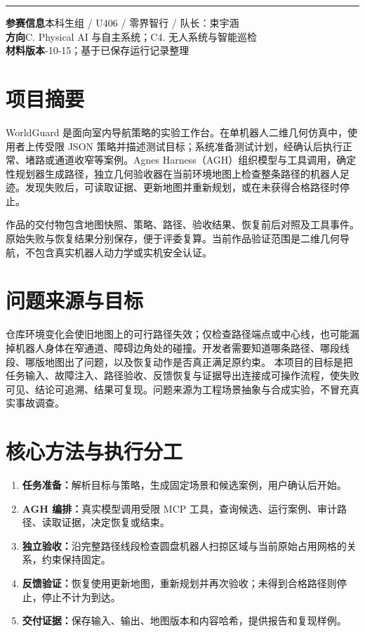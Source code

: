 \documentclass[UTF8,10pt,a4paper]{ctexart}
\newcommand{\cover}[2]{\vspace*{5mm}{\small\textcolor{teal}{WORLDGUARD / SUBMISSION 2026}}\par\vspace{4mm}{\huge\bfseries\color{ink}#1}\par\vspace{3mm}{\large #2}\par\vspace{4mm}\hrule\vspace{5mm}}
\begin{document}
\cover{WorldGuard 项目报告}{面向具身导航的故障测试、独立验收与恢复验证}
\textbf{参赛信息}\quad 本科生组 / U406 / 零界智行 / 队长：束宇涵\\
\textbf{方向}\quad C. Physical AI 与自主系统；C4. 无人系统与智能巡检\\
\textbf{材料版本}-10-15；基于已保存运行记录整理
\section{项目摘要}
WorldGuard 是面向室内导航策略的实验工作台。在单机器人二维几何仿真中，使用者上传受限 JSON 策略并描述测试目标；系统准备测试计划，经确认后执行正常、堵路或通道收窄等案例。Agnes Harness（AGH）组织模型与工具调用，确定性规划器生成路径，独立几何验收器在当前环境地图上检查整条路径的机器人足迹。发现失败后，可读取证据、更新地图并重新规划，或在未获得合格路径时停止。

作品的交付物包含地图快照、策略、路径、验收结果、恢复前后对照及工具事件。原始失败与恢复结果分别保存，便于评委复算。当前作品验证范围是二维几何导航，不包含真实机器人动力学或实机安全认证。
\section{问题来源与目标}
仓库环境变化会使旧地图上的可行路径失效；仅检查路径端点或中心线，也可能漏掉机器人身体在窄通道、障碍边角处的碰撞。开发者需要知道哪条路径、哪段线段、哪版地图出了问题，以及恢复动作是否真正满足原约束。
本项目的目标是把任务输入、故障注入、路径验收、反馈恢复与证据导出连接成可操作流程，使失败可见、结论可追溯、结果可复现。问题来源为工程场景抽象与合成实验，不冒充真实事故调查。
\section{核心方法与执行分工}
\begin{enumerate}
\item \textbf{任务准备：}解析目标与策略，生成固定场景和候选案例，用户确认后开始。
\item \textbf{AGH 编排：}真实模型调用受限 MCP 工具，查询候选、运行案例、审计路径、读取证据，决定恢复或结束。
\item \textbf{独立验收：}沿完整路径线段检查圆盘机器人扫掠区域与当前原始占用网格的关系，约束保持固定。
\item \textbf{反馈验证：}恢复使用更新地图，重新规划并再次验收；未得到合格路径则停止，停止不计为到达。
\item \textbf{交付证据：}保存输入、输出、地图版本和内容哈希，提供报告和复现样例。
\end{enumerate}
\end{document}
